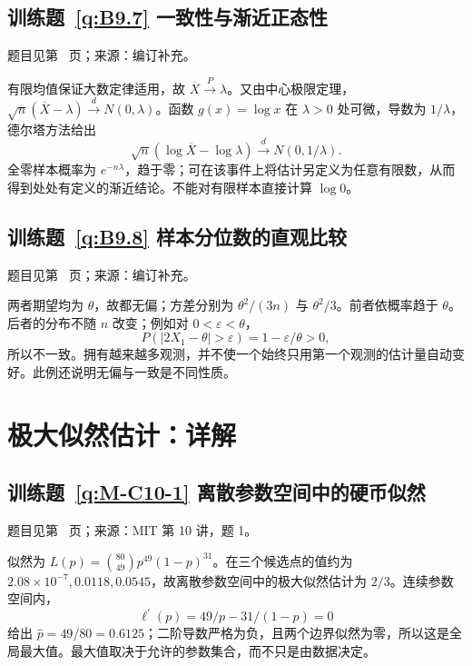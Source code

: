 \documentclass[UTF8,12pt,a4paper,fontset=fandol]{ctexbook}
\begin{document}
\subsection*{训练题~\ref{q:B9.7} 一致性与渐近正态性}\label{a:B9.7}{\small 题目见第~\pageref{q:B9.7} 页；来源：编订补充。}
\begin{solve}有限均值保证大数定律适用，故 $\overline X\xrightarrow{P}\lambda$。又由中心极限定理，$\sqrt n(\overline X-\lambda)\xrightarrow{d}N(0,\lambda)$。函数 $g(x)=\log x$ 在 $\lambda>0$ 处可微，导数为 $1/\lambda$，德尔塔方法给出\[\sqrt n(\log\overline X-\log\lambda)\xrightarrow{d}N(0,1/\lambda).\]全零样本概率为 $e^{-n\lambda}$，趋于零；可在该事件上将估计另定义为任意有限数，从而得到处处有定义的渐近结论。不能对有限样本直接计算 $\log0$。\end{solve}

\subsection*{训练题~\ref{q:B9.8} 样本分位数的直观比较}\label{a:B9.8}{\small 题目见第~\pageref{q:B9.8} 页；来源：编订补充。}
\begin{solve}两者期望均为 $\theta$，故都无偏；方差分别为 $\theta^2/(3n)$ 与 $\theta^2/3$。前者依概率趋于 $\theta$。后者的分布不随 $n$ 改变；例如对 $0<\varepsilon<\theta$，\[P(|2X_1-\theta|>\varepsilon)=1-\varepsilon/\theta>0,\]所以不一致。拥有越来越多观测，并不使一个始终只用第一个观测的估计量自动变好。此例还说明无偏与一致是不同性质。\end{solve}

\clearpage\section*{极大似然估计：详解}

\subsection*{训练题~\ref{q:M-C10-1} 离散参数空间中的硬币似然}\label{a:M-C10-1}{\small 题目见第~\pageref{q:M-C10-1} 页；来源：MIT 第 10 讲，题 1。}
\begin{solve}似然为 $L(p)=\binom{80}{49}p^{49}(1-p)^{31}$。在三个候选点的值约为 $2.08\times10^{-7},0.0118,0.0545$，故离散参数空间中的极大似然估计为 $2/3$。连续参数空间内，\[\ell^{\prime}(p)=49/p-31/(1-p)=0\]给出 $\widehat p=49/80=0.6125$；二阶导数严格为负，且两个边界似然为零，所以这是全局最大值。最大值取决于允许的参数集合，而不只是由数据决定。\end{solve}
\end{document}
